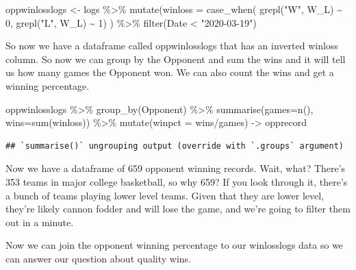 \documentclass[
]{book}
\newenvironment{Shaded}{\begin{snugshade}}{\end{snugshade}}
\newcommand{\AttributeTok}[1]{\textcolor[rgb]{0.77,0.63,0.00}{#1}}
\newcommand{\DecValTok}[1]{\textcolor[rgb]{0.00,0.00,0.81}{#1}}
\newcommand{\FunctionTok}[1]{\textcolor[rgb]{0.00,0.00,0.00}{#1}}
\newcommand{\NormalTok}[1]{#1}
\newcommand{\OtherTok}[1]{\textcolor[rgb]{0.56,0.35,0.01}{#1}}
\newcommand{\SpecialCharTok}[1]{\textcolor[rgb]{0.00,0.00,0.00}{#1}}
\newcommand{\StringTok}[1]{\textcolor[rgb]{0.31,0.60,0.02}{#1}}
\begin{document}
\begin{Shaded}
\begin{Highlighting}[]
\NormalTok{oppwinlosslogs }\OtherTok{\textless{}{-}}\NormalTok{ logs }\SpecialCharTok{\%\textgreater{}\%} \FunctionTok{mutate}\NormalTok{(}\AttributeTok{winloss =} \FunctionTok{case\_when}\NormalTok{(}
  \FunctionTok{grepl}\NormalTok{(}\StringTok{"W"}\NormalTok{, W\_L) }\SpecialCharTok{\textasciitilde{}} \DecValTok{0}\NormalTok{, }
  \FunctionTok{grepl}\NormalTok{(}\StringTok{"L"}\NormalTok{, W\_L) }\SpecialCharTok{\textasciitilde{}} \DecValTok{1}\NormalTok{)}
\NormalTok{) }\SpecialCharTok{\%\textgreater{}\%} \FunctionTok{filter}\NormalTok{(Date }\SpecialCharTok{\textless{}} \StringTok{"2020{-}03{-}19"}\NormalTok{)}
\end{Highlighting}
\end{Shaded}

So now we have a dataframe called oppwinlosslogs that has an inverted winloss column. So now we can group by the Opponent and sum the wins and it will tell us how many games the Opponent won. We can also count the wins and get a winning percentage.

\begin{Shaded}
\begin{Highlighting}[]
\NormalTok{oppwinlosslogs }\SpecialCharTok{\%\textgreater{}\%} \FunctionTok{group\_by}\NormalTok{(Opponent) }\SpecialCharTok{\%\textgreater{}\%} \FunctionTok{summarise}\NormalTok{(}\AttributeTok{games=}\FunctionTok{n}\NormalTok{(), }\AttributeTok{wins=}\FunctionTok{sum}\NormalTok{(winloss)) }\SpecialCharTok{\%\textgreater{}\%} \FunctionTok{mutate}\NormalTok{(}\AttributeTok{winpct =}\NormalTok{ wins}\SpecialCharTok{/}\NormalTok{games) }\OtherTok{{-}\textgreater{}}\NormalTok{ opprecord}
\end{Highlighting}
\end{Shaded}

\begin{verbatim}
## `summarise()` ungrouping output (override with `.groups` argument)
\end{verbatim}

Now we have a dataframe of 659 opponent winning records. Wait, what? There's 353 teams in major college basketball, so why 659? If you look through it, there's a bunch of teams playing lower level teams. Given that they are lower level, they're likely cannon fodder and will lose the game, and we're going to filter them out in a minute.

Now we can join the opponent winning percentage to our winlosslogs data so we can answer our question about quality wins.
\end{document}
